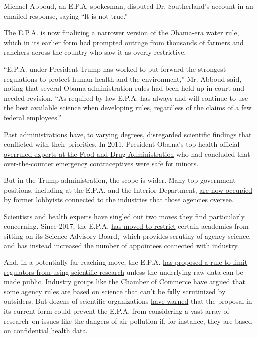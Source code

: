 Michael Abboud, an E.P.A. spokesman, disputed Dr. Southerland's account
in an emailed response, saying ``It is not true.''

The E.P.A. is now finalizing a narrower version of the Obama-era water
rule, which in its earlier form had prompted outrage from thousands of
farmers and ranchers across the country who saw it as overly
restrictive.

``E.P.A. under President Trump has worked to put forward the strongest
regulations to protect human health and the environment,'' Mr. Abboud
said, noting that several Obama administration rules had been held up in
court and needed revision. ``As required by law E.P.A. has always and
will continue to use the best available science when developing rules,
regardless of the claims of a few federal employees.''

Past administrations have, to varying degrees, disregarded scientific
findings that conflicted with their priorities. In 2011, President
Obama's top health official
\href{https://www.nytimes3xbfgragh.onion/2011/12/09/us/obama-backs-aides-stance-on-morning-after-pill.html}{overruled
experts at the Food and Drug Administration} who had concluded that
over-the-counter emergency contraceptives were safe for minors.

But in the Trump administration, the scope is wider. Many top government
positions, including at the E.P.A. and the Interior Department,
\href{https://www.nytimes3xbfgragh.onion/2019/10/18/climate/trump-cabinet-lobbyists.html}{are
now occupied by former lobbyists} connected to the industries that those
agencies oversee.

Scientists and health experts have singled out two moves they find
particularly concerning. Since 2017, the E.P.A.
\href{https://www.nytimes3xbfgragh.onion/2017/10/31/climate/pruitt-epa-science-advisory-boards.html}{has
moved to restrict} certain academics from sitting on its Science
Advisory Board,~which provides scrutiny of agency science, and has
instead increased the number of appointees connected with industry.

And, in a potentially far-reaching move, the E.P.A.
\href{https://www.nytimes3xbfgragh.onion/2018/03/26/climate/epa-scientific-transparency-honest-act.html}{has
proposed a rule to limit regulators from using scientific research}
unless the underlying raw data can be made public. Industry groups like
the Chamber of Commerce
\href{https://www.globalenergyinstitute.org/proposed-rulemaking-strengthening-transparency-regulatory-science}{have
argued} that some agency rules are based on science that can't be fully
scrutinized by outsiders. But dozens of scientific organizations
\href{https://mcmprodaaas.s3.amazonaws.com/s3fs-public/EPA\%20Transparency\%20Rule\%20FINAL.pdf?oNbdIjRo8Ick2LxdMeWaqWuYu4NM3unc}{have
warned} that the proposal in its current form could prevent the E.P.A.
from considering a vast array of research~on issues like the dangers of
air pollution if, for instance, they are based on confidential health
data.

